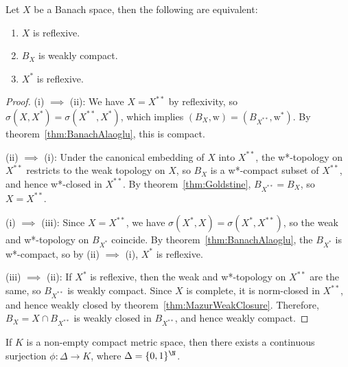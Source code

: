 \documentclass[a4paper]{article}
\begin{document}
\begin{nthm}\label{thm:Reflexive}
	Let $X$ be a Banach space, then the following are equivalent:
	\begin{enumerate}[label=(\roman*)]
		\item $X$ is reflexive.
		\item $B_X$ is weakly compact.
		\item $X^*$ is reflexive.
	\end{enumerate}
\end{nthm}
\begin{proof}
  (i) $\implies$ (ii): We have $X=X^{**}$ by reflexivity, so $\sigma(X,X^*)=\sigma(X^{**},X^*)$, which implies $(B_X,\mathrm{w})=(B_{X^{**}},\mathrm{w^*})$. By theorem~\ref{thm:BanachAlaoglu}, this is compact.

  (ii) $\implies$ (i): Under the canonical embedding of $X$ into $X^{**}$, the w*-topology on $X^{**}$ restricts to the weak topology on $X$, so $B_X$ is a w*-compact subset of $X^{**}$, and hence w*-closed in $X^{**}$. By theorem~\ref{thm:Goldstine}, $B_{X^{**}}=B_X$, so $X=X^{**}$.

  (i) $\implies$ (iii): Since $X=X^{**}$, we have $\sigma(X^*,X)=\sigma(X^*,X^{**})$, so the weak and w*-topology on $B_{X^*}$ coincide. By theorem~\ref{thm:BanachAlaoglu}, the $B_{X^*}$ is w*-compact, so by (ii) $\implies$ (i), $X^*$ is reflexive.

  (iii) $\implies$ (ii): If $X^*$ is reflexive, then the weak and w*-topology on $X^{**}$ are the same, so $B_{X^{**}}$ is weakly compact. Since $X$ is complete, it is norm-closed in $X^{**}$, and hence weakly closed by theorem~\ref{thm:MazurWeakClosure}. Therefore, $B_X=X\cap B_{X^{**}}$ is weakly closed in $B_{X^{**}}$, and hence weakly compact.
\end{proof}

\begin{nlemma}\label{lem:CantorSetInitial}
  If $K$ is a non-empty compact metric space, then there exists a continuous surjection $\phi:\Delta\to K$, where $\Delta=\{0,1\}^\N$.
\end{nlemma}
\end{document}
